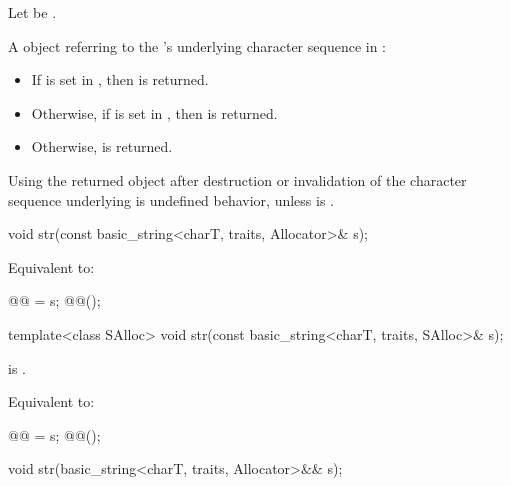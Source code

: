 \begin{itemdescr}
\pnum
Let  be .

\pnum
\returns
A  object referring to
the 's underlying character sequence in :
\begin{itemize}
\item If  is set in ,
  then  is returned.
\item Otherwise, if  is set in ,
  then  is returned.
\item Otherwise,  is returned.
\end{itemize}

\pnum
\begin{note}
Using the returned  object after
destruction or invalidation of the character sequence underlying 
is undefined behavior, unless  is .
\end{note}
\end{itemdescr}

%
\begin{itemdecl}
void str(const basic_string<charT, traits, Allocator>& s);
\end{itemdecl}

\begin{itemdescr}
\pnum
\effects
Equivalent to:
\begin{codeblock}
@@ = s;
@@();
\end{codeblock}
\end{itemdescr}

%
\begin{itemdecl}
template<class SAlloc>
  void str(const basic_string<charT, traits, SAlloc>& s);
\end{itemdecl}

\begin{itemdescr}
\pnum
\constraints
{} is .

\pnum
\effects
Equivalent to:
\begin{codeblock}
@@ = s;
@@();
\end{codeblock}
\end{itemdescr}

%
\begin{itemdecl}
void str(basic_string<charT, traits, Allocator>&& s);
\end{itemdecl}

